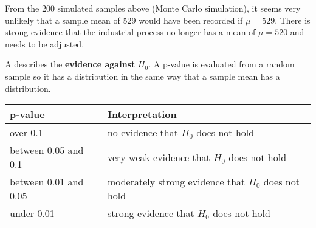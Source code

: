 

From the 200 simulated samples above (Monte Carlo simulation), it seems very unlikely that a sample mean of 529 would have been recorded if $\mu = 529$. There is strong evidence that the industrial process no longer has a mean of $\mu = 520$ and needs to be adjusted.

\begin{definition}[p-value]
    A  describes the \textbf{evidence against} $H_0$. A p-value is evaluated from a random sample so it has a distribution in the same way that a sample mean has a distribution.
\end{definition}

\begin{center}
    \begin{tabular}{p{4cm}|p{7cm}}
        \textbf{p-value} & \textbf{Interpretation} \\
        \hline
        over 0.1 & no evidence that $H_0$ does not hold \\
        between 0.05 and 0.1 & very weak evidence that $H_0$ does not hold \\
        between 0.01 and 0.05 & moderately strong evidence that $H_0$ does not hold \\
        under 0.01 & strong evidence that $H_0$ does not hold
    \end{tabular}
\end{center}

